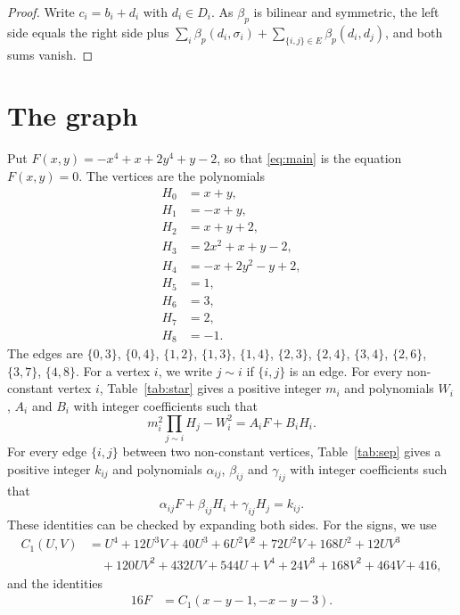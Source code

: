 \documentclass[11pt]{article}
\begin{document}
\begin{proof}
Write $c_i=b_i+d_i$ with $d_i\in D_i$. As $\beta_p$ is bilinear and symmetric, the left side equals the right side plus $\sum_i\beta_p(d_i,\sigma_i)+\sum_{\{i,j\}\in E}\beta_p(d_i,d_j)$, and both sums vanish.
\end{proof}

\section{The graph}

Put $F(x,y)=-x^{4}+x+2y^{4}+y-2$, so that \eqref{eq:main} is the equation $F(x,y)=0$. The vertices are the polynomials
\begin{align*}
H_{0}&=x+y,\\
H_{1}&=-x+y,\\
H_{2}&=x+y+2,\\
H_{3}&=2x^{2}+x+y-2,\\
H_{4}&=-x+2y^{2}-y+2,\\
H_{5}&=1,\\
H_{6}&=3,\\
H_{7}&=2,\\
H_{8}&=-1.
\end{align*}
The edges are $\{0,3\}$, $\{0,4\}$, $\{1,2\}$, $\{1,3\}$, $\{1,4\}$, $\{2,3\}$, $\{2,4\}$, $\{3,4\}$, $\{2,6\}$, $\{3,7\}$, $\{4,8\}$. For a vertex $i$, we write $j\sim i$ if $\{i,j\}$ is an edge.
For every non-constant vertex $i$, Table~\ref{tab:star} gives a positive integer $m_{i}$ and polynomials $W_{i}$, $A_{i}$ and $B_{i}$ with integer coefficients such that
\begin{equation}\label{eq:star}
m_i^2\prod_{j\sim i}H_j-W_i^2=A_iF+B_iH_i.
\end{equation}
For every edge $\{i,j\}$ between two non-constant vertices, Table~\ref{tab:sep} gives a positive integer $k_{ij}$ and polynomials $\alpha_{ij}$, $\beta_{ij}$ and $\gamma_{ij}$ with integer coefficients such that
\begin{equation}\label{eq:sep}
\alpha_{ij}F+\beta_{ij}H_i+\gamma_{ij}H_j=k_{ij}.
\end{equation}
These identities can be checked by expanding both sides.
For the signs, we use
\begin{align*}
C_{1}(U,V)&=U^{4}+12U^{3}V+40U^{3}+6U^{2}V^{2}+72U^{2}V+168U^{2}+12UV^{3}\\
&\quad+120UV^{2}+432UV+544U+V^{4}+24V^{3}+168V^{2}+464V+416,
\end{align*}
and the identities
\begin{align}
16F&=C_{1}(x-y-1,-x-y-3).\label{eq:cone1}
\end{align}
\end{document}
